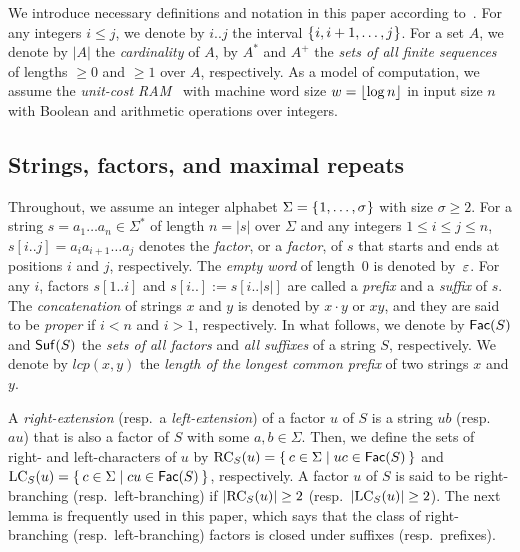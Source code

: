 We introduce necessary definitions and notation in this paper according to~\cite{charalampopoulos2018extended,barton2014linear,ilie2011minimum,belazzougui2020linear}. 
For any integers $i\le j$, we denote by $i..j$
the interval $\{\kern0.05emi, i+1, \dots, j\kern0.05em\}$. For a set $A$, we denote by $|A|$ the \textit{cardinality} of $A$, by $A^*$ and $A^+$ the \textit{sets of all finite sequences} of lengths $\ge 0$ and $\ge 1$ over $A$, respectively.
As a model of computation, we assume the \textit{unit-cost RAM}~\cite{cormen2009introduction} with machine word size $w = \lfloor \log n\rfloor$ in input size $n$ with
Boolean and arithmetic
operations over integers.

\subsection{Strings, factors, and maximal repeats}

Throughout, we assume an integer alphabet $\Sigma = \{\kern0.05em1, \dots, \sigma\kern0.05em\}$ with size $\sigma \ge 2$. 
For a string $s = a_1\dots a_n \in \Sigma^*$ of length $n = |s|$ over $\Sigma$ and any integers $1\le i\le j\le n$, $s[i..j] = a_i a_{i+1}\dots a_j$ denotes the \textit{factor}, or a \textit{factor}, of $s$ that starts and ends at positions $i$ and $j$, respectively. The \textit{empty word} of length~$0$ is denoted by~$\varepsilon$. For any $i$, factors $s[1..i]$ and $s[i..] := s[i..|s|]$ are called a \textit{prefix} and a \textit{suffix} of $s$. The \textit{concatenation} of strings $x$ and $y$ is denoted by $x\cdot y$ or $xy$, and they are said to be \textit{proper} if $i < n$ and $i > 1$, respectively. 
In what follows, we denote by $\mathsf{Fac}{(S)}$ and $\mathsf{Suf}{(S)}$ the \textit{sets of all factors} and \textit{all suffixes} of a string $S$, respectively. We denote by $lcp(x, y)$ the \textit{length of the longest common prefix} of two strings $x$ and $y$. 

A \textit{right-extension} (resp.~a \textit{left-extension}) of a factor $u$ of $S$ is a string $ub$ (resp.~$au$) that is also a factor of $S$
with some $a,b \in \Sigma$.
Then, we define the sets of right- and left-characters of $u$ by $\mathrm{RC}_{S}(u) = \{\kern0.2em c \in \Sigma \mid uc \in \mathsf{Fac}{(S)} \kern0.2em\}$ and $\mathrm{LC}_{S}(u) = \{\kern0.2em c \in \Sigma \mid cu \in \mathsf{Fac}{(S)} \kern0.2em\}$, respectively. A factor $u$ of $S$ is said to be right-branching (resp.~left-branching) if $|\mathrm{RC}_{S}(u)|\ge 2$ (resp.~$|\mathrm{LC}_{S}(u)|\ge 2$). The next lemma is frequently used in this paper, which says that the class of right-branching (resp.~left-branching) factors is closed under suffixes (resp.~prefixes). 

